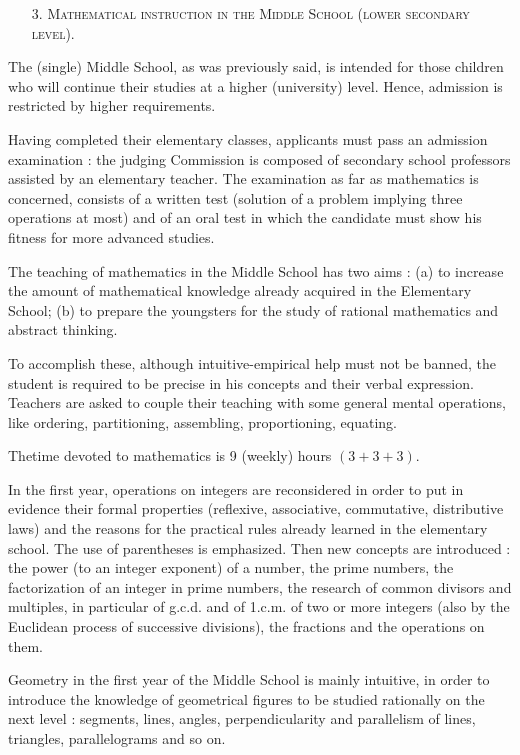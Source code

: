 \begin{itemize}
\item[3.] \textsc{Mathematical instruction in the Middle School (lower secondary level).}
\end{itemize}

The (single) Middle School, as was previously said, is intended for those children who will continue their studies at a higher (university) level. Hence, admission is restricted by higher requirements.

Having completed their elementary classes, applicants must pass an admission examination : the judging Commission is composed of secondary school professors assisted by an elementary teacher. The examination as far as mathematics is concerned, consists of a written test (solution of a problem implying three operations at most) and of an oral test in which the candidate must show his fitness for more advanced studies.

The teaching of mathematics in the Middle School has two aims : (a) to increase the amount of mathematical knowledge already acquired in the Elementary School; (b) to prepare the youngsters for the study of rational mathematics and abstract thinking.

To accomplish these, although intuitive-empirical help must not be banned, the student is required to be precise in his concepts and their verbal expression. Teachers are asked to couple their teaching with some general mental operations, like ordering, partitioning, assembling, proportioning, equating.

The\pageoriginale time devoted to mathematics is 9 (weekly) hours $(3+3+3)$.

In the first year, operations on integers are reconsidered in order to put in evidence their formal properties (reflexive, associative, commutative, distributive laws) and the reasons for the practical rules already learned in the elementary school. The use of parentheses is emphasized. Then new concepts are introduced : the power (to an integer exponent) of a number, the prime numbers, the factorization of an integer in prime numbers, the research of common divisors and multiples, in particular of g.c.d. and of 1.c.m. of two or more integers (also by the Euclidean process of successive divisions), the fractions and the operations on them.

Geometry in the first year of the Middle School is mainly intuitive, in order to introduce the knowledge of geometrical figures to be studied rationally on the next level : segments, lines, angles, perpendicularity and parallelism of lines, triangles, parallelograms and so on.

